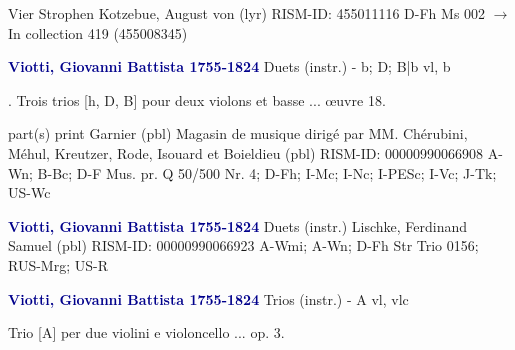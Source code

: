 \documentclass[twocolumn]{book}
\begin{document}
\newline Vier Strophen
\newline Kotzebue, August von  (lyr)
\newline RISM-ID: 455011116
\newline D-Fh  Ms 002
\newline $\rightarrow$ In collection 419 (455008345)
      
\newline \par \vspace{7pt} \textcolor{darkblue}{\textbf{Viotti, Giovanni Battista  1755-1824}}
\newline Duets (instr.) - b; D; B|b
 vl, b
\newline \begin{itshape}. Trois trios [h, D, B] pour deux violons et basse ... œuvre 18.\end{itshape} 
\newline \textcolor{darkblue}{}  part(s)
\newline print
\newline Garnier  (pbl)
\newline Magasin de musique dirigé par MM. Chérubini, Méhul, Kreutzer, Rode, Isouard et Boieldieu  (pbl)
\newline RISM-ID: 00000990066908
\newline A-Wn; B-Bc; D-F  Mus. pr. Q 50/500 Nr. 4; D-Fh; I-Mc; I-Nc; I-PESc; I-Vc; J-Tk; US-Wc
\newline \par \vspace{7pt} \textcolor{darkblue}{\textbf{Viotti, Giovanni Battista  1755-1824}}
\newline Duets (instr.)
\newline Lischke, Ferdinand Samuel  (pbl)
\newline RISM-ID: 00000990066923
\newline A-Wmi; A-Wn; D-Fh  Str Trio 0156; RUS-Mrg; US-R
\newline \par \vspace{7pt} \textcolor{darkblue}{\textbf{Viotti, Giovanni Battista  1755-1824}}
\newline Trios (instr.) - A
 vl, vlc
\newline \begin{itshape}Trio [A] per due violini e violoncello ... op. 3.\end{itshape} 
\end{document}
